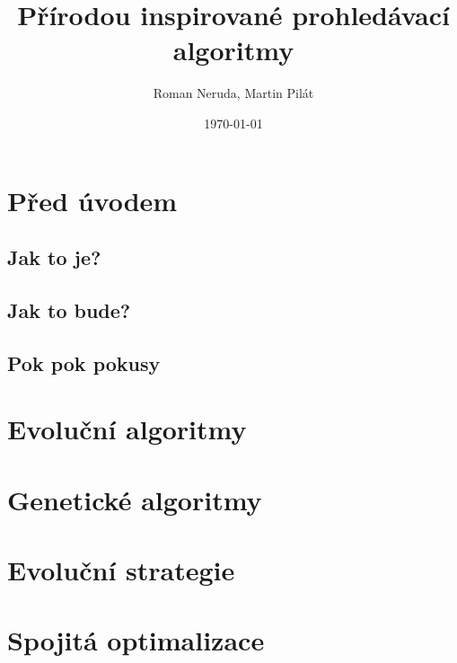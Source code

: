 \documentclass[a4paper,nofonts,nohyper,justified,colorinlistoftodos,hidelinks]{tufte-book}
\title{Přírodou inspirované prohledávací algoritmy}
\author{Roman Neruda, Martin Pilát}
\date{\today}
\begin{document}
\maketitle

\mainmatter

\chapter{Před úvodem}
\section{Jak to je?}

\section{Jak to bude?}
\section{Pok pok pokusy}


\chapter{Evoluční algoritmy}


\chapter{Genetické algoritmy}


\chapter{Evoluční strategie}

\chapter{Spojitá optimalizace}


\backmatter

\tableofcontents
\listoffigures
\listoftables
\listofalgorithms 
\printindex
\setcounter{tocdepth}{1}
\listoftodos

\nocite{*}


\end{document}
